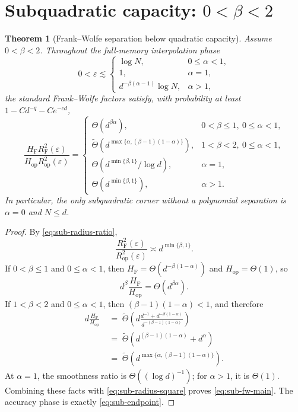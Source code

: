 \documentclass[11pt]{article}
\newtheorem{theorem}{Theorem}[section]
\newcommand{\eps}{\varepsilon}
\newcommand{\RF}{R_{\mathrm F}}
\newcommand{\Rop}{R_{\mathrm{op}}}
\newcommand{\HF}{H_{\mathrm F}}
\newcommand{\Hop}{H_{\mathrm{op}}}
\begin{document}
\section{Subquadratic capacity: \texorpdfstring{$0<\beta<2$}{0<beta<2}}

\begin{theorem}[Frank--Wolfe separation below quadratic capacity]
\label{thm:sub-fw}
Assume $0<\beta<2$.  Throughout the full-memory interpolation phase
\begin{equation}
 0<\eps\lesssim
 \begin{cases}
 \log N,&0\leq\alpha<1,\\
 1,&\alpha=1,\\
 d^{-\beta(\alpha-1)}\log N,&\alpha>1,
 \end{cases}
 \label{eq:sub-fw-phase}
\end{equation}
the standard Frank--Wolfe factors satisfy, with probability at least
$1-Cd^{-q}-Ce^{-cd}$,
\begin{equation}
 \frac{\HF\RF^2(\eps)}{\Hop\Rop^2(\eps)}
 =
 \begin{cases}
 \Theta\!\left(d^{\beta\alpha}\right),
     &0<\beta\leq1,\ 0\leq\alpha<1,\\[1mm]
 \widetilde\Theta\!\left(
 d^{\max\{\alpha,(\beta-1)(1-\alpha)\}}
 \right),
     &1<\beta<2,\ 0\leq\alpha<1,\\[1mm]
 \Theta\!\left(
 d^{\min\{\beta,1\}}/\log d
 \right),&\alpha=1,\\[1mm]
 \Theta\!\left(d^{\min\{\beta,1\}}\right),&\alpha>1.
 \end{cases}
 \label{eq:sub-fw-main}
\end{equation}
In particular, the only subquadratic corner without a polynomial
separation is $\alpha=0$ and $N\leq d$.
\end{theorem}

\begin{proof}
By \eqref{eq:sub-radius-ratio},
\begin{equation}
 \frac{\RF^2(\eps)}{\Rop^2(\eps)}
 \asymp d^{\min\{\beta,1\}}.
 \label{eq:sub-radius-square}
\end{equation}
If $0<\beta\leq1$ and $0\leq\alpha<1$, then
$\HF=\Theta(d^{-\beta(1-\alpha)})$ and $\Hop=\Theta(1)$, so
\[
 d^\beta\frac{\HF}{\Hop}
 =\Theta(d^{\beta\alpha}).
\]
If $1<\beta<2$ and $0\leq\alpha<1$, then
$(\beta-1)(1-\alpha)<1$, and therefore
\begin{align*}
 d\frac{\HF}{\Hop}
 &\;=\;
 \widetilde\Theta\!\left(
 d\frac{d^{-1}+d^{-\beta(1-\alpha)}}
 {d^{-(\beta-1)(1-\alpha)}}
 \right)\\
 &\;=\;
 \widetilde\Theta\!\left(
 d^{(\beta-1)(1-\alpha)}+d^\alpha
 \right)\\
 &\;=\;
 \widetilde\Theta\!\left(
 d^{\max\{\alpha,(\beta-1)(1-\alpha)\}}
 \right).
\end{align*}
At $\alpha=1$, the smoothness ratio is
$\Theta((\log d)^{-1})$; for $\alpha>1$, it is $\Theta(1)$.
Combining these facts with \eqref{eq:sub-radius-square} proves
\eqref{eq:sub-fw-main}.  The accuracy phase is exactly
\eqref{eq:sub-endpoint}.
\end{proof}
\end{document}
